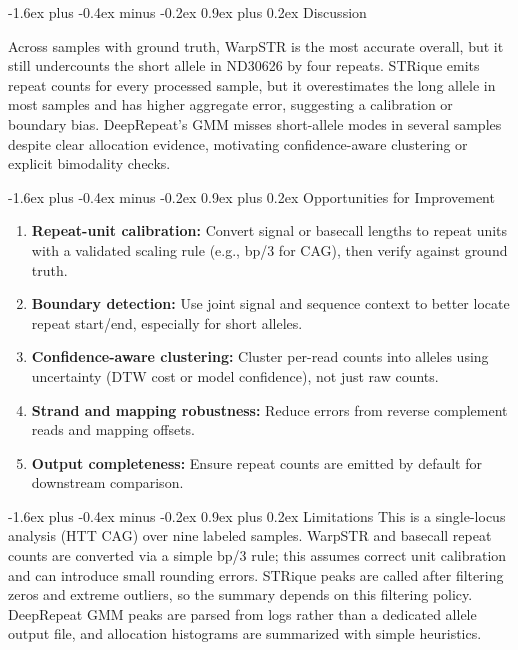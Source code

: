 \documentclass[sigconf]{acmart}
\makeatletter
\renewcommand\section{\@startsection{section}{1}{\z@}%
  {-1.6ex plus -0.4ex minus -0.2ex}%
  {0.9ex plus 0.2ex}%
  {\normalfont\large\bfseries}}
\makeatother
\begin{document}
\section{Discussion}

Across samples with ground truth, WarpSTR is the most accurate overall, but it still undercounts the short allele in ND30626 by four repeats. STRique emits repeat counts for every processed sample, but it overestimates the long allele in most samples and has higher aggregate error, suggesting a calibration or boundary bias. DeepRepeat's GMM misses short-allele modes in several samples despite clear allocation evidence, motivating confidence-aware clustering or explicit bimodality checks.

\section{Opportunities for Improvement}
\begin{enumerate}
  \item \textbf{Repeat-unit calibration:} Convert signal or basecall lengths to repeat units with a validated scaling rule (e.g., bp/3 for CAG), then verify against ground truth.
  \item \textbf{Boundary detection:} Use joint signal and sequence context to better locate repeat start/end, especially for short alleles.
  \item \textbf{Confidence-aware clustering:} Cluster per-read counts into alleles using uncertainty (DTW cost or model confidence), not just raw counts.
  \item \textbf{Strand and mapping robustness:} Reduce errors from reverse complement reads and mapping offsets.
  \item \textbf{Output completeness:} Ensure repeat counts are emitted by default for downstream comparison.
\end{enumerate}

\section{Limitations}
This is a single-locus analysis (HTT CAG) over nine labeled samples. WarpSTR and basecall repeat counts are converted via a simple bp/3 rule; this assumes correct unit calibration and can introduce small rounding errors. STRique peaks are called after filtering zeros and extreme outliers, so the summary depends on this filtering policy. DeepRepeat GMM peaks are parsed from logs rather than a dedicated allele output file, and allocation histograms are summarized with simple heuristics.
\end{document}
